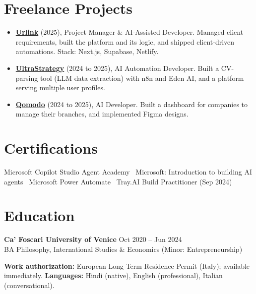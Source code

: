 \documentclass[a4paper,10pt]{article}
\begin{document}
\section{Freelance Projects}
\begin{itemize}
 \item \textbf{\href{https://smarturlink.com/}{Urlink}} (2025), Project Manager \& AI-Assisted Developer. Managed client requirements, built the platform and its logic, and shipped client-driven automations. Stack: Next.js, Supabase, Netlify.
 \item \textbf{\href{https://ultrastrategy.com}{UltraStrategy}} (2024 to 2025), AI Automation Developer. Built a CV-parsing tool (LLM data extraction) with n8n and Eden AI, and a platform serving multiple user profiles.
 \item \textbf{\href{https://www.qomodo.me/}{Qomodo}} (2024 to 2025), AI Developer. Built a dashboard for companies to manage their branches, and implemented Figma designs.
\end{itemize}

\section{Certifications}
Microsoft Copilot Studio Agent Academy \textbullet\ Microsoft: Introduction to building AI agents \textbullet\ Microsoft Power Automate \textbullet\ Tray.AI Build Practitioner (Sep 2024)

\section{Education}
\textbf{Ca' Foscari University of Venice} \hfill Oct 2020 -- Jun 2024\\
BA Philosophy, International Studies \& Economics (Minor: Entrepreneurship)

\vspace{2pt}
{\small \textbf{Work authorization:} European Long Term Residence Permit (Italy); available immediately. \quad \textbf{Languages:} Hindi (native), English (professional), Italian (conversational).}
\end{document}
